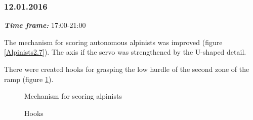 \subsubsection{12.01.2016}
\textit{\textbf{Time frame:}} 17:00-21:00

The mechanism for scoring autonomous alpinists was improved (figure \ref{Alpinists2.7}). The axis if the servo was strengthened by the U-shaped detail.

There were created hooks for grasping the low hurdle of the second zone of the ramp (figure \ref{Hooks1.1}).

\begin{figure}[H]
	\begin{minipage}[h]{0.47\linewidth}
		\caption{Mechanism for scoring alpinists}
		\label{Alpinists2.7}
	\end{minipage}
	\hfill
	\begin{minipage}[h]{0.47\linewidth}
		\caption{Hooks}
		\label{Hooks1.1}
	\end{minipage}
\end{figure}
